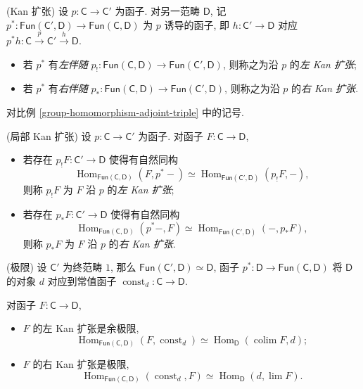 \begin{definition}
	{(Kan 扩张)}
	设 $p\colon \mathsf C\to \mathsf C'$ 为函子. 对另一范畴 $\mathsf D$, 记
	$p^* \colon \mathsf {Fun}(\mathsf C',\mathsf D) \to \mathsf {Fun}(\mathsf C,\mathsf D)$ 为 $p$ 诱导的函子,
	即 $h\colon \mathsf C'\to \mathsf D$ 对应 $p^*h\colon \mathsf C \overset{p}{\to} \mathsf C' \overset{h}{\to}\mathsf D$.
	
	\begin{itemize}
		\item 若 $p^*$ 有\emph{左伴随} $p_! \colon \mathsf {Fun}(\mathsf C,\mathsf D) \to \mathsf {Fun}(\mathsf C',\mathsf D)$,
		则称之为沿 $p$ 的\emph{左 Kan 扩张};
		\item 若 $p^*$ 有\emph{右伴随} $p_* \colon \mathsf {Fun}(\mathsf C,\mathsf D) \to \mathsf {Fun}(\mathsf C',\mathsf D)$,
		则称之为沿 $p$ 的\emph{右 Kan 扩张}.
	\end{itemize}
	
\end{definition}

对比例 \ref{group-homomorphism-adjoint-triple} 中的记号.

\begin{definition}
	{(局部 Kan 扩张)}
	设 $p\colon \mathsf C\to \mathsf C'$ 为函子. 对函子 $F \colon \mathsf C \to \mathsf D$,
	\begin{itemize}
		\item 若存在 $p_! F \colon \mathsf C' \to \mathsf D$ 使得有自然同构
		$$
		\operatorname{Hom}_{\mathsf {Fun}(\mathsf C,\mathsf D)}(F,p^* -) \simeq \operatorname{Hom}_{\mathsf {Fun}(\mathsf C',\mathsf D)}(p_! F ,-),
		$$
		则称 $p_!F$ 为 $F$ 沿 $p$ 的\emph{左 Kan 扩张};
		\item 若存在 $p_* F \colon \mathsf C' \to \mathsf D$ 使得有自然同构
		$$
		\operatorname{Hom}_{\mathsf {Fun}(\mathsf C,\mathsf D)}(p^*-,F) \simeq \operatorname{Hom}_{\mathsf {Fun}(\mathsf C',\mathsf D)}(-,p_*F),
		$$
		则称 $p_*F$ 为 $F$ 沿 $p$ 的\emph{右 Kan 扩张}.
	\end{itemize}
\end{definition}

\begin{example}
	{(极限)}
	设 $\mathsf C'$ 为终范畴 $1$, 那么 $\mathsf {Fun}(\mathsf C',\mathsf D)\simeq\mathsf D$, 函子 $p^*\colon \mathsf D \to \mathsf {Fun}(\mathsf C,\mathsf D)$
	将 $\mathsf D$ 的对象 $d$ 对应到常值函子 $\operatorname{const}_d \colon \mathsf C \to \mathsf D$.
	
	对函子 $F \colon \mathsf C \to \mathsf D$,
	\begin{itemize}
		\item $F$ 的左 Kan 扩张是余极限,
		$$
		\operatorname{Hom}_{\mathsf {Fun}(\mathsf C,\mathsf D)}(F,\operatorname{const}_d)\simeq \operatorname{Hom}_{\mathsf D}(\operatorname{colim}F,d);
		$$
		\item $F$ 的右 Kan 扩张是极限,
		$$
		\operatorname{Hom}_{\mathsf {Fun}(\mathsf C,\mathsf D)}(\operatorname{const}_d,F)\simeq \operatorname{Hom}_{\mathsf D}(d,\lim F).
		$$
	\end{itemize}
	
\end{example}

